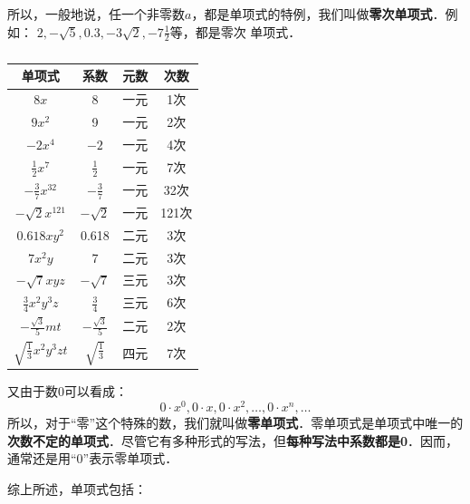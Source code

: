 所以，一般地说，任一个非零数$a$，都是单项式的特例，我们叫做\textbf{零次单项式}．例如：
$2,-\sqrt{5}, 0.3,-3\sqrt{2},-7\frac{1}{2}$等，都是零次
单项式．
\begin{table}
    \caption{}
    \begin{center}
        \begin{tabular}{cccc}
            \hline
            单项式&        系数& 元数&        次数 \\
            \hline
            $8x$& 8& 一元 & 1次\\
            $9x^2$& 9& 一元 & 2次\\
            $-2x^4$& $-2$& 一元 & 4次\\
            $\frac{1}{2}x^7$& $\frac{1}{2}$& 一元 & 7次\\
            $-\frac{3}{7}x^{32}$& $-\frac{3}{7}$& 一元 & 32次\\
            $-\sqrt{2}x^{121}$& $-\sqrt{2}$ & 一元& 121次     \\
            $0.618xy^2$& 0.618 & 二元& 3次  \\
             $7x^2y$ & 7 & 二元& 3次    \\
              $-\sqrt{7}xyz$ & $-\sqrt{7}$ & 三元& 3次     \\
              $\frac{3}{4}x^2y^3z$  & $\frac{3}{4}$ & 三元& 6次   \\
            $-\frac{\sqrt{3}}{5}mt$  & $-\frac{\sqrt{3}}{5}$ & 二元& 2次   \\
            $\sqrt{\frac{1}{3}}x^2y^3zt$  & $\sqrt{\frac{1}{3}}$ & 四元& 7次    \\
            \hline
        \end{tabular}
    \end{center}
\end{table}



又由于数0可以看成：
\[0\cdot x^0, 0\cdot x, 0\cdot x^2, \ldots , 0\cdot x^n, \ldots\]
所以，对于“零”这个特殊的数，我们就叫做\textbf{零单项式}．零单项式是单项式中唯一的\textbf{次数不定的单项式}．尽管它有多种形式的写法，但\textbf{每种写法中系数都是0}．因而，通常还是用“0”表示零单项式．

综上所述，单项式包括：
\begin{center}
\end{center}

